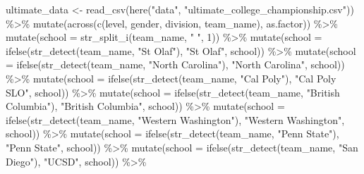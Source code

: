 \documentclass[
  letterpaper,
  DIV=11,
  numbers=noendperiod]{scrartcl}
\newenvironment{Shaded}{\begin{snugshade}}{\end{snugshade}}
\newcommand{\AttributeTok}[1]{\textcolor[rgb]{0.40,0.45,0.13}{#1}}
\newcommand{\DecValTok}[1]{\textcolor[rgb]{0.68,0.00,0.00}{#1}}
\newcommand{\FunctionTok}[1]{\textcolor[rgb]{0.28,0.35,0.67}{#1}}
\newcommand{\NormalTok}[1]{\textcolor[rgb]{0.00,0.23,0.31}{#1}}
\newcommand{\OtherTok}[1]{\textcolor[rgb]{0.00,0.23,0.31}{#1}}
\newcommand{\SpecialCharTok}[1]{\textcolor[rgb]{0.37,0.37,0.37}{#1}}
\newcommand{\StringTok}[1]{\textcolor[rgb]{0.13,0.47,0.30}{#1}}
\begin{document}
\begin{Shaded}
\begin{Highlighting}[]
\NormalTok{ultimate\_data }\OtherTok{\textless{}{-}} \FunctionTok{read\_csv}\NormalTok{(}\FunctionTok{here}\NormalTok{(}\StringTok{"data"}\NormalTok{, }\StringTok{"ultimate\_college\_championship.csv"}\NormalTok{)) }\SpecialCharTok{\%\textgreater{}\%}
  \FunctionTok{mutate}\NormalTok{(}\FunctionTok{across}\NormalTok{(}\FunctionTok{c}\NormalTok{(level, gender, division, team\_name), as.factor)) }\SpecialCharTok{\%\textgreater{}\%}
  \FunctionTok{mutate}\NormalTok{(}\AttributeTok{school =} \FunctionTok{str\_split\_i}\NormalTok{(team\_name, }\StringTok{" "}\NormalTok{, }\DecValTok{1}\NormalTok{)) }\SpecialCharTok{\%\textgreater{}\%}
  \FunctionTok{mutate}\NormalTok{(}\AttributeTok{school =} \FunctionTok{ifelse}\NormalTok{(}\FunctionTok{str\_detect}\NormalTok{(team\_name, }\StringTok{"St Olaf"}\NormalTok{), }\StringTok{"St Olaf"}\NormalTok{, school)) }\SpecialCharTok{\%\textgreater{}\%}
  \FunctionTok{mutate}\NormalTok{(}\AttributeTok{school =} \FunctionTok{ifelse}\NormalTok{(}\FunctionTok{str\_detect}\NormalTok{(team\_name, }\StringTok{"North Carolina"}\NormalTok{), }\StringTok{"North Carolina"}\NormalTok{, school)) }\SpecialCharTok{\%\textgreater{}\%}
  \FunctionTok{mutate}\NormalTok{(}\AttributeTok{school =} \FunctionTok{ifelse}\NormalTok{(}\FunctionTok{str\_detect}\NormalTok{(team\_name, }\StringTok{"Cal Poly"}\NormalTok{), }\StringTok{"Cal Poly SLO"}\NormalTok{, school))  }\SpecialCharTok{\%\textgreater{}\%}
  \FunctionTok{mutate}\NormalTok{(}\AttributeTok{school =} \FunctionTok{ifelse}\NormalTok{(}\FunctionTok{str\_detect}\NormalTok{(team\_name, }\StringTok{"British Columbia"}\NormalTok{), }\StringTok{"British Columbia"}\NormalTok{, school))  }\SpecialCharTok{\%\textgreater{}\%}
  \FunctionTok{mutate}\NormalTok{(}\AttributeTok{school =} \FunctionTok{ifelse}\NormalTok{(}\FunctionTok{str\_detect}\NormalTok{(team\_name, }\StringTok{"Western Washington"}\NormalTok{), }\StringTok{"Western Washington"}\NormalTok{, school))  }\SpecialCharTok{\%\textgreater{}\%}
  \FunctionTok{mutate}\NormalTok{(}\AttributeTok{school =} \FunctionTok{ifelse}\NormalTok{(}\FunctionTok{str\_detect}\NormalTok{(team\_name, }\StringTok{"Penn State"}\NormalTok{), }\StringTok{"Penn State"}\NormalTok{, school))  }\SpecialCharTok{\%\textgreater{}\%}
  \FunctionTok{mutate}\NormalTok{(}\AttributeTok{school =} \FunctionTok{ifelse}\NormalTok{(}\FunctionTok{str\_detect}\NormalTok{(team\_name, }\StringTok{"San Diego"}\NormalTok{), }\StringTok{"UCSD"}\NormalTok{, school))  }\SpecialCharTok{\%\textgreater{}\%}

\end{Highlighting}
\end{Shaded}
\end{document}
